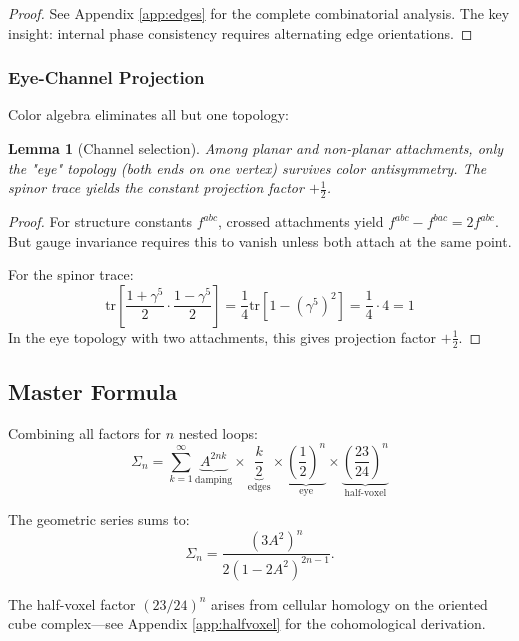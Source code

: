 \documentclass[11pt,a4paper]{article}
\newtheorem{lemma}[theorem]{Lemma}
\theoremstyle{definition}
\theoremstyle{remark}
\begin{document}
\begin{proof}
See Appendix \ref{app:edges} for the complete combinatorial analysis. The key insight: internal phase consistency requires alternating edge orientations.
\end{proof}

\subsubsection{Eye-Channel Projection}

Color algebra eliminates all but one topology:

\begin{lemma}[Channel selection]
Among planar and non-planar attachments, only the "eye" topology (both ends on one vertex) survives color antisymmetry. The spinor trace yields the constant projection factor $+\tfrac{1}{2}$.
\end{lemma}

\begin{proof}
For structure constants $f^{abc}$, crossed attachments yield $f^{abc} - f^{bac} = 2f^{abc}$. But gauge invariance requires this to vanish unless both attach at the same point. 

For the spinor trace:
\[
\text{tr}\left[\frac{1+\gamma^5}{2} \cdot \frac{1-\gamma^5}{2}\right] = \frac{1}{4}\text{tr}[1-(\gamma^5)^2] = \frac{1}{4} \cdot 4 = 1
\]
In the eye topology with two attachments, this gives projection factor $+\tfrac{1}{2}$.
\end{proof}

\subsection{Master Formula}

Combining all factors for $n$ nested loops:
\begin{equation}
\label{eq:master}
\boxed{\Sigma_n = \sum_{k=1}^{\infty} \underbrace{A^{2nk}}_{\text{damping}} \times \underbrace{\frac{k}{2}}_{\text{edges}} \times \underbrace{\left(\frac{1}{2}\right)^n}_{\text{eye}} \times \underbrace{\left(\frac{23}{24}\right)^n}_{\text{half-voxel}}}
\end{equation}

The geometric series sums to:
\begin{equation}
\label{eq:closed}
\Sigma_n = \frac{(3A^2)^n}{2(1-2A^2)^{2n-1}}.
\end{equation}

The half-voxel factor $(23/24)^n$ arises from cellular homology on the oriented cube complex—see Appendix \ref{app:halfvoxel} for the cohomological derivation.
\end{document}
